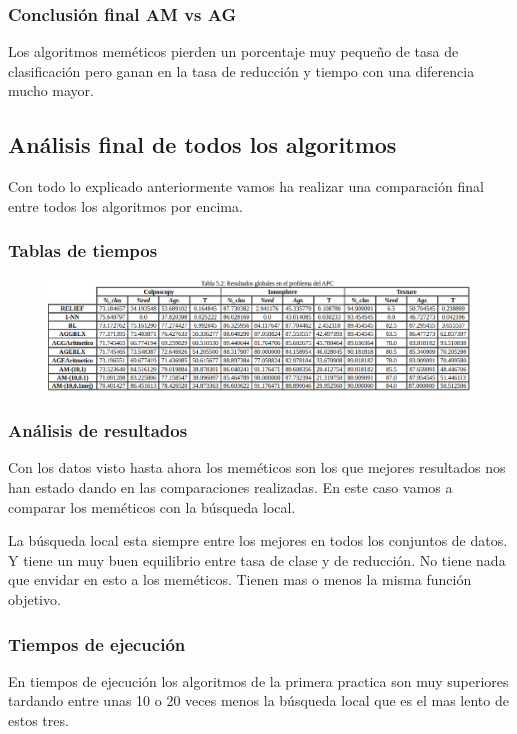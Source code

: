 \documentclass[titlepage]{article}
\begin{document}
	\subsubsection{Conclusión final AM vs AG}
	Los algoritmos meméticos pierden un porcentaje muy pequeño de tasa de clasificación pero ganan en la tasa de reducción y tiempo con una diferencia mucho mayor.
	
	\subsection{Análisis final de todos los algoritmos}
	Con todo lo explicado anteriormente vamos ha realizar una comparación final entre todos los algoritmos por encima.
	\subsubsection{Tablas de tiempos}
	\begin{figure}[H]
		\centering
		\includegraphics[width=1\linewidth]{screenshot011}
		\caption{}
		\label{fig:screenshot011}
	\end{figure}

	\subsubsection{Análisis de resultados}
	Con los datos visto hasta ahora los meméticos son los que mejores resultados nos han estado dando en las comparaciones realizadas. En este caso vamos a comparar los meméticos con la búsqueda local. 
	
	La búsqueda local esta siempre entre los mejores en todos los conjuntos de datos. Y tiene un muy buen equilibrio entre tasa de clase y de reducción. No tiene nada que envidar en esto a los meméticos. Tienen mas o menos la misma función objetivo.  
	
	\subsubsection{Tiempos de ejecución}
	En tiempos de ejecución  los algoritmos de la primera practica son muy superiores tardando entre unas 10 o 20 veces menos la búsqueda local que es el mas lento de estos tres.
	
\end{document}
